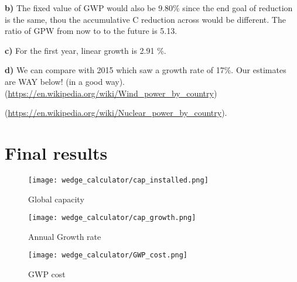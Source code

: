 \documentclass[11pt]{article}
\begin{document}
\colorbox{harvardcrimson!20}{ \textbf{b)} } The fixed value of GWP would also be 9.80\% since the end goal of reduction is the same, thou the accumulative C reduction across would be different. The ratio of GPW from now to to the future is 5.13. 

\colorbox{harvardcrimson!20}{ \textbf{c)} }  For the first year, linear growth is 2.91 \%. 

\colorbox{harvardcrimson!20}{ \textbf{d)} } We can compare with 2015 which saw a growth rate of 17\%. Our estimates are WAY below! (in a good way). (\url{https://en.wikipedia.org/wiki/Wind_power_by_country})


(\url{https://en.wikipedia.org/wiki/Nuclear_power_by_country}).

\section{Final results}

\begin{figure}[htp]
\centering
\texttt{[image: wedge\_calculator/cap\_installed.png]}
\caption{Global capacity}
\label{}
\end{figure}

\begin{figure}[htp]
\centering
\texttt{[image: wedge\_calculator/cap\_growth.png]}
\caption{Annual Growth rate}
\label{}
\end{figure}

\begin{figure}[htp]
\centering
\texttt{[image: wedge\_calculator/GWP\_cost.png]}
\caption{GWP cost}
\label{}
\end{figure}
\end{document}
